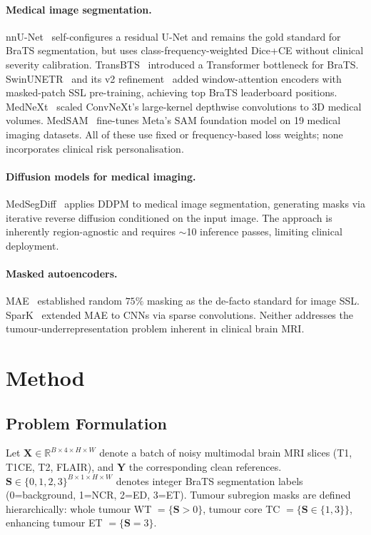 \documentclass[runningheads]{llncs}
\begin{document}
\paragraph{Medical image segmentation.}
nnU-Net~\cite{nnunet} self-configures a residual U-Net and remains the
gold standard for BraTS segmentation, but uses class-frequency-weighted
Dice+CE without clinical severity calibration.
TransBTS~\cite{transbts} introduced a Transformer bottleneck for BraTS.
SwinUNETR~\cite{swinunetr} and its v2 refinement~\cite{swinunetrv2} added
window-attention encoders with masked-patch SSL pre-training, achieving
top BraTS leaderboard positions.
MedNeXt~\cite{mednext} scaled ConvNeXt's large-kernel depthwise convolutions
to 3D medical volumes.
MedSAM~\cite{medsam} fine-tunes Meta's SAM foundation model on 19
medical imaging datasets.
All of these use fixed or frequency-based loss weights; none incorporates
clinical risk personalisation.

\paragraph{Diffusion models for medical imaging.}
MedSegDiff~\cite{medsegdiff} applies DDPM to medical image segmentation,
generating masks via iterative reverse diffusion conditioned on the input
image. The approach is inherently region-agnostic and requires
$\sim$10 inference passes, limiting clinical deployment.

\paragraph{Masked autoencoders.}
MAE~\cite{he2022mae} established random $75\%$ masking as the de-facto
standard for image SSL. SparK~\cite{spark} extended MAE to CNNs via sparse
convolutions. Neither addresses the tumour-underrepresentation problem
inherent in clinical brain MRI.


\section{Method}
\label{sec:method}

\subsection{Problem Formulation}

Let $\mathbf{X} \in \mathbb{R}^{B \times 4 \times H \times W}$ denote a
batch of noisy multimodal brain MRI slices (T1, T1CE, T2, FLAIR), and
$\mathbf{Y}$ the corresponding clean references.
$\mathbf{S} \in \{0, 1, 2, 3\}^{B \times 1 \times H \times W}$
denotes integer BraTS segmentation labels
(0=background, 1=NCR, 2=ED, 3=ET).
Tumour subregion masks are defined hierarchically:
whole tumour WT $= \{\mathbf{S}>0\}$,
tumour core TC $= \{\mathbf{S}\in\{1,3\}\}$,
enhancing tumour ET $= \{\mathbf{S}=3\}$.
\end{document}
